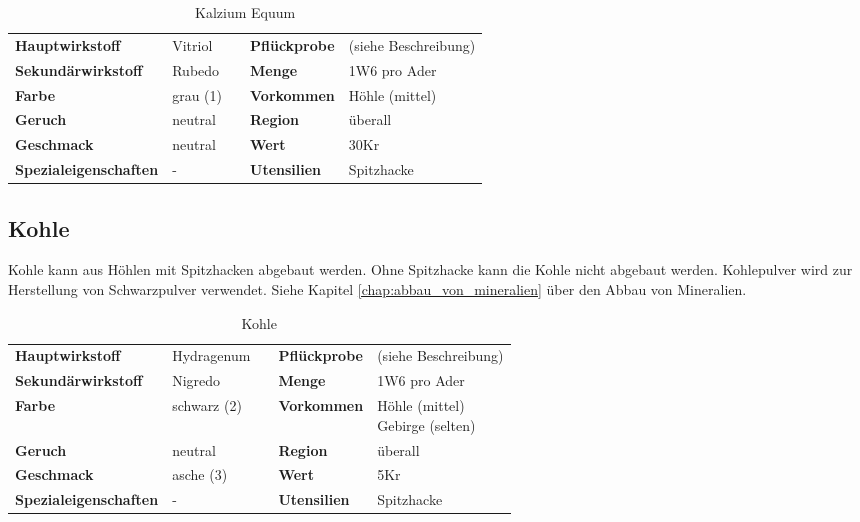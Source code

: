 \begin{table}[h] 
\begin{center} 
\begin{tabular}{|l|l|p{1cm}|l|l|} 
  	\cline{1-2} \cline{4-5} 
  	\textbf{Hauptwirkstoff} & Vitriol && \textbf{Pflückprobe} & (siehe Beschreibung) \\ \cline{1-2} \cline{4-5} 
  	\textbf{Sekundärwirkstoff} & Rubedo && \textbf{Menge} & 1W6 pro Ader \\ \cline{1-2} \cline{4-5} 
  	\textbf{Farbe} & grau (1) && \textbf{Vorkommen} & Höhle (mittel) \\ \cline{1-2} \cline{4-5} 
  	\textbf{Geruch} & neutral && \textbf{Region} & überall \\ \cline{1-2} \cline{4-5} 
  	\textbf{Geschmack} & neutral && \textbf{Wert} & 30Kr \\ \cline{1-2} \cline{4-5} 
  	\textbf{Spezialeigenschaften} & - && \textbf{Utensilien} & Spitzhacke \\ \cline{1-2} \cline{4-5} 
\end{tabular} 
\end{center} 
\caption{Kalzium Equum} 
\label{tab:kalzium_equum} 
\end{table}


\subsection{Kohle}
\label{chap:kohle}
Kohle kann aus Höhlen mit Spitzhacken abgebaut werden. Ohne Spitzhacke kann die Kohle nicht abgebaut werden. Kohlepulver wird zur Herstellung von Schwarzpulver verwendet. Siehe Kapitel \ref{chap:abbau_von_mineralien} über den Abbau von Mineralien.

\begin{table}[h] 
\begin{center} 
\begin{tabular}{|l|l|p{1cm}|l|l|} 
  	\cline{1-2} \cline{4-5} 
  	\textbf{Hauptwirkstoff} & Hydragenum && \textbf{Pflückprobe} & (siehe Beschreibung) \\ \cline{1-2} \cline{4-5} 
  	\textbf{Sekundärwirkstoff} & Nigredo && \textbf{Menge} & 1W6 pro Ader \\ \cline{1-2} \cline{4-5} 
  	\textbf{Farbe} & schwarz (2) && \textbf{Vorkommen} & \brcell{Höhle (mittel) \\ Gebirge (selten)} \\ \cline{1-2} \cline{4-5} 
  	\textbf{Geruch} & neutral && \textbf{Region} & überall \\ \cline{1-2} \cline{4-5} 
  	\textbf{Geschmack} & asche (3) && \textbf{Wert} & 5Kr \\ \cline{1-2} \cline{4-5} 
  	\textbf{Spezialeigenschaften} & - && \textbf{Utensilien} & Spitzhacke \\ \cline{1-2} \cline{4-5} 
\end{tabular} 
\end{center} 
\caption{Kohle} 
\label{tab:kohle} 
\end{table}



